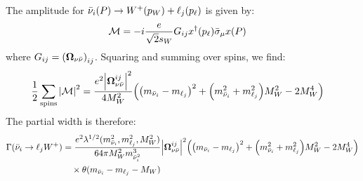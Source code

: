 The amplitude for \(\bar{\nu}_{i}(P) \to W^{+}(p_{W}) + \ell_{j}(p_{\ell})\) is given by:
\begin{align}
    \mathcal{M} & = -i\frac{e}{\sqrt{2}s_{W}}G_{ij} x^{\dagger}(p_{\ell})\bar{\sigma}_{\mu}x(P)
\end{align}
where \(G_{ij} = \qty(\bm{\Omega}_{\nu\bar{\nu}})_{ij}\). Squaring and summing
over spins, we find:
\begin{align}
    \frac{1}{2}\sum_{\mathrm{spins}}\qty|\mathcal{M}|^2
     & =
    \frac{e^{2}\qty|\bm{\Omega}_{\nu\bar{\nu}}^{ij}|^2}{4M_{W}^{2}}
    \qty(
    \qty(m_{\bar{\nu}_{i}}-m_{\ell_{j}})^{2}
    +\qty(m^{2}_{\bar{\nu}_{i}}+m^{2}_{\ell_{j}})M_{W}^{2}
    -2M_{W}^{4}
    )
\end{align}
The partial width is therefore:
\begin{align}
    \Gamma(\bar{\nu}_{i}\to \ell_{j}W^{+})
     & =
    \frac{e^{2}\lambda^{1/2}(m^{2}_{\bar{\nu}_{i}},m_{\ell_{j}}^2,M_{W}^{2})}{64\pi M^{2}_{W}m^{3}_{\bar{\nu}^{2}_{i}}}
    \qty|\bm{\Omega}_{\nu\bar{\nu}}^{ij}|^2
    \qty(
    \qty(m_{\bar{\nu}_{i}}-m_{\ell_{j}})^{2}
    +\qty(m^{2}_{\bar{\nu}_{i}}+m^{2}_{\ell_{j}})M_{W}^{2}
    -2M_{W}^{4}
    )\notag                                               \\
     & \quad\times\theta(m_{\bar{\nu}_{i}}-m_{\ell_{j}}-M_{W})
\end{align}